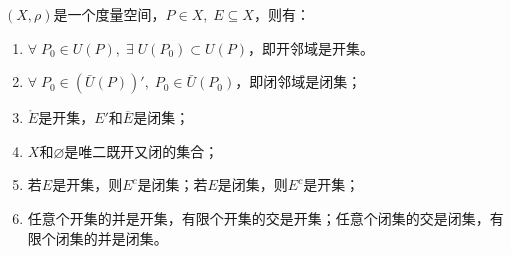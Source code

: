 \begin{property}\label{prop:OpenClosedSet}
	$(X,\rho)$是一个度量空间，$P\in X,\;E\subseteq X$，则有：
	\begin{enumerate}
		\item $\forall\;P_0\in U(P),\;\exists\;U(P_0)\subset U(P)$，即开邻域是开集。
		\item $\forall\;P_0\in\left(\bar{U}(P)\right)',\;P_0\in \bar{U}(P_0)$，即闭邻域是闭集；
		\item $\mathring{E}$是开集，$E'$和$\overline{E}$是闭集；
		\item $X$和$\varnothing$是唯二既开又闭的集合；
		\item 若$E$是开集，则$E^c$是闭集；若$E$是闭集，则$E^c$是开集；
		\item 任意个开集的并是开集，有限个开集的交是开集；任意个闭集的交是闭集，有限个闭集的并是闭集。
	\end{enumerate}
\end{property}
